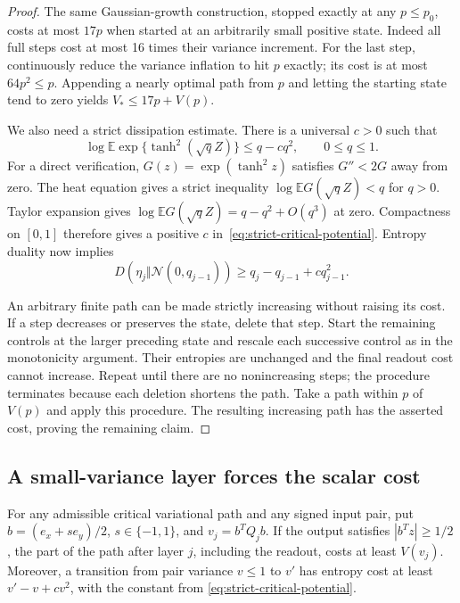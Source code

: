 \begin{proof}
The same Gaussian-growth construction, stopped exactly at any
$p\le p_0$, costs at most $17p$ when started at an arbitrarily small
positive state. Indeed all full steps cost at most 16 times their
variance increment. For the last step, continuously reduce the variance
inflation to hit $p$ exactly; its cost is at most $64p^2\le p$.
Appending a nearly optimal path from $p$ and letting the starting state
tend to zero yields $V_*\le17p+V(p)$.

We also need a strict dissipation estimate. There is a universal $c>0$
such that
\begin{equation}\label{eq:strict-critical-potential}
 \log\mathbb E\exp\{\tanh^2(\sqrt qZ)\}\le q-cq^2,
 \qquad 0\le q\le1.
\end{equation}
For a direct verification, $G(z)=\exp(\tanh^2z)$ satisfies $G''<2G$
away from zero. The heat equation gives a strict inequality
$\log\mathbb EG(\sqrt qZ)<q$ for $q>0$.
Taylor expansion gives
$\log\mathbb EG(\sqrt qZ)=q-q^2+O(q^3)$ at zero. Compactness on
$[0,1]$ therefore gives a positive $c$ in~\eqref{eq:strict-critical-potential}.
Entropy duality now implies
\begin{equation}\label{eq:scalar-step-dissipation}
 D(\eta_j\Vert\mathcal N(0,q_{j-1}))
 \ge q_j-q_{j-1}+cq_{j-1}^2.
\end{equation}

An arbitrary finite path can be made strictly increasing without raising
its cost. If a step decreases or preserves the state, delete that step.
Start the remaining controls at the larger preceding state and rescale
each successive control as in the monotonicity argument. Their entropies
are unchanged and the final readout cost cannot increase. Repeat until
there are no nonincreasing steps; the procedure terminates because each
deletion shortens the path. Take a path within $p$ of $V(p)$ and apply
this procedure. The resulting increasing path has the asserted cost, proving the
remaining claim.
\end{proof}

\subsection{A small-variance layer forces the scalar cost}

\begin{lemma}
\label{lem:critical-pair-scalar-comparison}
For any admissible critical variational path and any signed input pair,
put $b=(e_x+se_y)/2$, $s\in\{-1,1\}$, and $v_j=b^TQ_jb$.
If the output satisfies $|b^Tz|\ge1/2$, the part of the path after
layer $j$, including the readout, costs at least $V(v_j)$.
Moreover, a transition from pair variance $v\le1$ to $v'$ has
entropy cost at least $v'-v+cv^2$, with the constant from
\eqref{eq:strict-critical-potential}.
\end{lemma}

